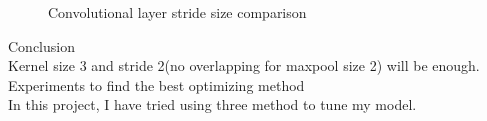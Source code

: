 \documentclass[11pt, a4paper]{article} %
\begin{document}
\begin{figure}[H]
  \centering
  \hfill
  \caption{Convolutional layer stride size comparison}
\end{figure}
{\Large Conclusion}
\\ Kernel size 3 and stride 2(no overlapping for maxpool size 2) will be enough. \newline \break
{\Large Experiments to find the best optimizing method}
\\ In this project, I have tried using three method to tune my model.
\end{document}
